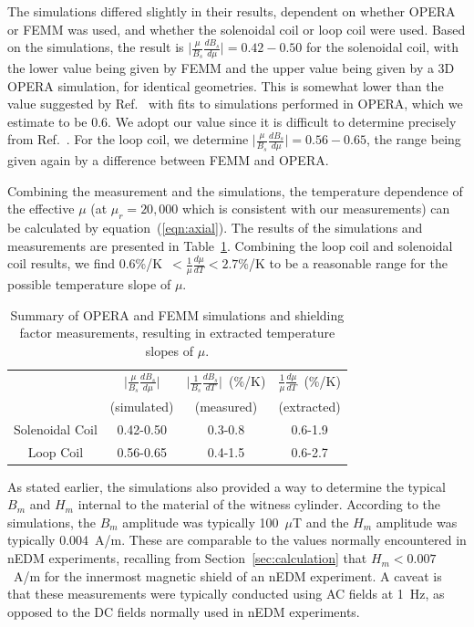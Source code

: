 The simulations differed slightly in their results, dependent on
whether OPERA or FEMM was used, and whether the solenoidal coil or
loop coil were used.  Based on the simulations, the result is
$\vert\frac{\mu}{B_s}\frac{dB_s}{d\mu}\vert=0.42-0.50$ for the
solenoidal coil, with the lower value being given by FEMM and the
upper value being given by a 3D OPERA simulation, for identical
geometries.  This is somewhat lower than the value suggested by
Ref.~\cite{bib:paperno-open-ended} with fits to simulations performed
in OPERA, which we estimate to be 0.6.  We adopt our value since it is
difficult to determine precisely from
Ref.~\cite{bib:paperno-open-ended}.  For the loop coil, we determine
$\vert\frac{\mu}{B_s}\frac{dB_s}{d\mu}\vert=0.56-0.65$, the range
being given again by a difference between FEMM and OPERA.

Combining the measurement and the simulations, the temperature
dependence of the effective $\mu$ (at $\mu_r=20,000$ which is
consistent with our measurements) can be calculated by
equation~(\ref{eqn:axial}).  The results of the simulations and
measurements are presented in Table~\ref{tab:axialsummary}.  Combining
the loop coil and solenoidal coil results, we find
0.6\%/K~$<\frac{1}{\mu}\frac{d\mu}{dT}<2.7\%$/K to be a reasonable
range for the possible temperature slope of $\mu$.

\begin{table}
\begin{center}
\begin{tabular}{|c|c|c|c|}
\hline 
  & $\vert \frac{\mu}{B_s}\frac{dB_s}{d\mu}\vert$ & $\vert \frac{1}{B_s} \frac{dB_s}{dT}\vert$~(\%/K) & $\frac{1}{\mu}\frac{d\mu}{dT}$~(\%/K) \\ 
 & (simulated) & (measured) & (extracted) \\
\hline 
Solenoidal Coil & 0.42-0.50 & 0.3-0.8 & 0.6-1.9 \\ 
\hline 
Loop Coil & 0.56-0.65 & 0.4-1.5 & 0.6-2.7 \\ 
\hline 
\end{tabular} 
\caption{Summary of OPERA and FEMM simulations and shielding factor
  measurements, resulting in extracted temperature slopes of $\mu$.}
\label{tab:axialsummary}
\end{center}

\end{table}


As stated earlier, the simulations also provided a way to determine
the typical $B_m$ and $H_m$ internal to the material of the witness
cylinder.  According to the simulations, the $B_m$ amplitude was
typically 100~$\mu$T and the $H_m$ amplitude was typically 0.004~A/m.
These are comparable to the values normally encountered in nEDM
experiments, recalling from Section~\ref{sec:calculation} that
$H_m<0.007$~A/m for the innermost magnetic shield of an nEDM
experiment.  A caveat is that these measurements were typically
conducted using AC fields at 1~Hz, as opposed to the DC fields
normally used in nEDM experiments.

